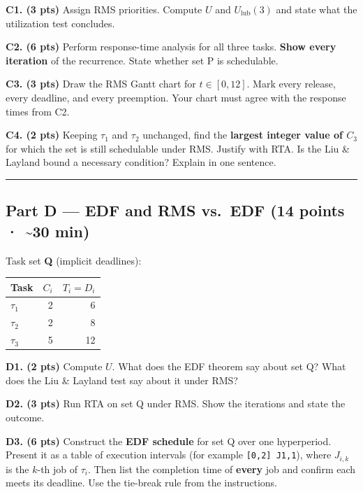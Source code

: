 \documentclass[
  11pt,
]{article}
\newcounter{none} %
\begin{document}
\textbf{C1. (3 pts)} Assign RMS priorities. Compute \(U\) and
\(U_{\text{lub}}(3)\) and state what the utilization test concludes.

\textbf{C2. (6 pts)} Perform response-time analysis for all three tasks.
\textbf{Show every iteration} of the recurrence. State whether set P is
schedulable.

\textbf{C3. (3 pts)} Draw the RMS Gantt chart for \(t \in [0, 12]\).
Mark every release, every deadline, and every preemption. Your chart
must agree with the response times from C2.

\textbf{C4. (2 pts)} Keeping \(\tau_1\) and \(\tau_2\) unchanged, find
the \textbf{largest integer value of \(C_3\)} for which the set is still
schedulable under RMS. Justify with RTA. Is the Liu \& Layland bound a
necessary condition? Explain in one sentence.

\begin{center}\rule{0.5\linewidth}{0.5pt}\end{center}

\subsection{Part D --- EDF and RMS vs.~EDF (14 points ·
\textasciitilde30
min)}\label{part-d-edf-and-rms-vs.-edf-14-points-30-min}

Task set \textbf{Q} (implicit deadlines):

{\def\LTcaptype{none} %
\begin{longtable}[]{@{}lrr@{}}
\toprule\noalign{}
Task & \(C_i\) & \(T_i = D_i\) \\
\midrule\noalign{}
\endhead
\bottomrule\noalign{}
\endlastfoot
\(\tau_1\) & 2 & 6 \\
\(\tau_2\) & 2 & 8 \\
\(\tau_3\) & 5 & 12 \\
\end{longtable}
}

\textbf{D1. (2 pts)} Compute \(U\). What does the EDF theorem say about
set Q? What does the Liu \& Layland test say about it under RMS?

\textbf{D2. (3 pts)} Run RTA on set Q under RMS. Show the iterations and
state the outcome.

\textbf{D3. (6 pts)} Construct the \textbf{EDF schedule} for set Q over
one hyperperiod. Present it as a table of execution intervals (for
example \texttt{{[}0,2{]}\ J1,1}), where \(J_{i,k}\) is the \(k\)-th job
of \(\tau_i\). Then list the completion time of \textbf{every} job and
confirm each meets its deadline. Use the tie-break rule from the
instructions.
\end{document}
